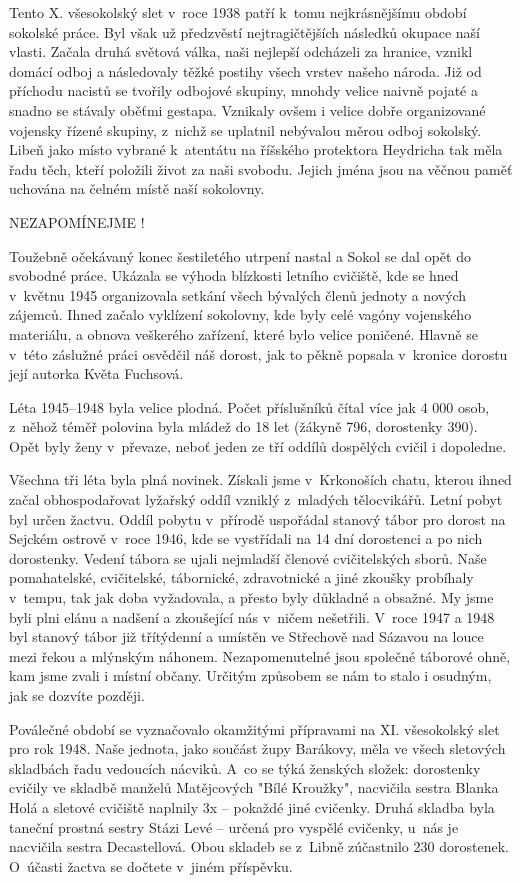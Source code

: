 \documentclass[a5paper, 11pt, twoside]{article}
\begin{document}
Tento X. všesokolský slet v~roce 1938 patří k~tomu nejkrásnějšímu období
sokolské práce. Byl však už předzvěstí nejtragičtějších následků okupace
naší vlasti. Začala druhá světová válka, naši nejlepší odcházeli za
hranice, vznikl domácí odboj a následovaly těžké postihy všech vrstev
našeho národa. Již od příchodu nacistů se tvořily odbojové skupiny,
mnohdy velice naivně pojaté a snadno se stávaly oběťmi gestapa. Vznikaly
ovšem i velice dobře organizované vojensky řízené skupiny, z~nichž se
uplatnil nebývalou měrou odboj sokolský. Libeň jako místo vybrané
k~atentátu na říšského protektora Heydricha tak měla řadu těch, kteří
položili život za naši svobodu. Jejich jména jsou na věčnou paměť
uchována na čelném místě naší sokolovny.

NEZAPOMÍNEJME !

Toužebně očekávaný konec šestiletého utrpení nastal a Sokol se dal opět
do svobodné práce. Ukázala se výhoda blízkosti letního cvičiště, kde se
hned v~květnu 1945 organizovala setkání všech bývalých členů jednoty a
nových zájemců. Ihned začalo vyklízení sokolovny, kde byly celé vagóny
vojenského materiálu, a obnova veškerého zařízení, které bylo velice
poničené. Hlavně se v~této záslužné práci osvědčil náš dorost, jak to
pěkně popsala v~kronice dorostu její autorka Květa Fuchsová.

Léta 1945--1948 byla velice plodná. Počet příslušníků čítal
více jak 4 000 osob, z~něhož téměř polovina byla mládež do 18 let
(žákyně 796, dorostenky 390). Opět byly ženy v~převaze, neboť jeden ze
tří oddílů dospělých cvičil i dopoledne.

Všechna tři léta byla plná novinek. Získali jsme v~Krkonoších chatu,
kterou ihned začal obhospodařovat lyžařský oddíl vzniklý z~mladých
tělocvikářů. Letní pobyt byl určen žactvu. Oddíl pobytu v~přírodě
uspořádal stanový tábor pro dorost na Sejckém ostrově v~roce 1946, kde
se vystřídali na 14 dní dorostenci a po nich dorostenky. Vedení tábora
se ujali nejmladší členové cvičitelských sborů. Naše pomahatelské,
cvičitelské, tábornické, zdravotnické a jiné zkoušky probíhaly v~tempu,
tak jak doba vyžadovala, a přesto byly důkladné a obsažné. My jsme byli
plni elánu a nadšení a zkoušející nás v~ničem nešetřili. V~roce 1947 a
1948 byl stanový tábor již třítýdenní a umístěn ve Střechově nad Sázavou
na louce mezi řekou a mlýnským náhonem. Nezapomenutelné jsou společné
táborové ohně, kam jsme zvali i místní občany. Určitým způsobem se nám
to stalo i osudným, jak se dozvíte později.

Poválečné období se vyznačovalo okamžitými přípravami na XI. všesokolský
slet pro rok 1948. Naše jednota, jako součást župy Barákovy, měla ve
všech sletových skladbách řadu vedoucích nácviků. A~co se týká ženských
složek: dorostenky cvičily ve skladbě manželů Matějcových "Bílé
Kroužky", nacvičila sestra Blanka Holá a sletové cvičiště naplnily 3x
-- pokaždé jiné cvičenky. Druhá skladba byla taneční prostná sestry
Stázi Levé -- určená pro vyspělé cvičenky, u~nás je nacvičila sestra
Decastellová. Obou skladeb se z~Libně zúčastnilo 230 dorostenek.
O~účasti žactva se dočtete v~jiném příspěvku.
\end{document}
